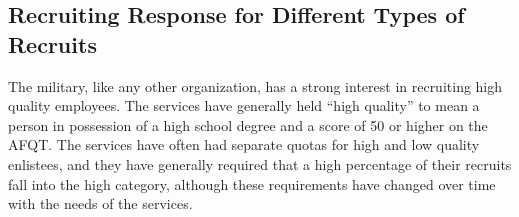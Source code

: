 \documentclass[12pt] {article}
\begin{document}
\subsection{Recruiting Response for Different Types of Recruits \label{sub:Different Recruit Types}}




The military, like any other organization, has a strong interest in
recruiting high quality employees. The services have generally held {}``high
quality'' to mean a person in possession of a high school degree
and a score of 50 or higher on the AFQT. The services have often had
separate quotas for high and low quality enlistees, and they have
generally required that a high percentage of their recruits fall into
the high category, although these requirements have changed over time
with the needs of the services. 
\end{document}
